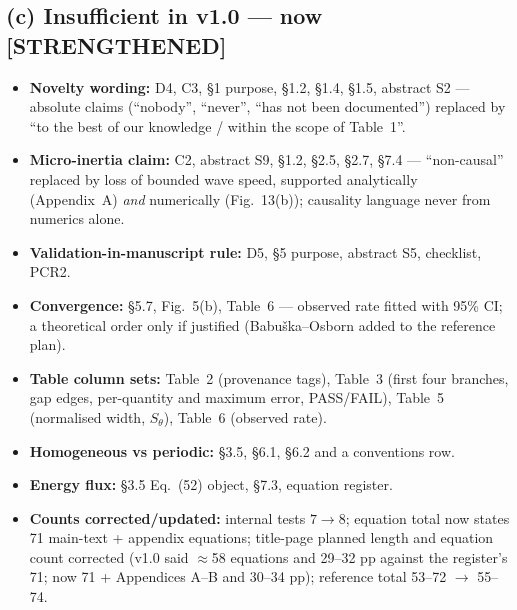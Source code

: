 \documentclass[11pt,a4paper]{article}
\newcommand{\STR}{{\color{strcol}\textbf{[STRENGTHENED]}}}
\begin{document}
\subsection*{(c) Insufficient in v1.0 --- now \STR}
\begin{itemize}
\item \textbf{Novelty wording:} D4, C3, \S1 purpose, \S1.2, \S1.4, \S1.5, abstract S2 ---
absolute claims (``nobody'', ``never'', ``has not been documented'') replaced by ``to the
best of our knowledge / within the scope of Table~1''.
\item \textbf{Micro-inertia claim:} C2, abstract S9, \S1.2, \S2.5, \S2.7, \S7.4 ---
``non-causal'' replaced by loss of bounded wave speed, supported analytically (Appendix~A)
\emph{and} numerically (Fig.~13(b)); causality language never from numerics alone.
\item \textbf{Validation-in-manuscript rule:} D5, \S5 purpose, abstract S5, checklist, PCR2.
\item \textbf{Convergence:} \S5.7, Fig.~5(b), Table~6 --- observed rate fitted with 95\% CI;
a theoretical order only if justified (Babu\v{s}ka--Osborn added to the reference plan).
\item \textbf{Table column sets:} Table~2 (provenance tags), Table~3 (first four branches,
gap edges, per-quantity and maximum error, PASS/FAIL), Table~5 (normalised width, $S_\theta$),
Table~6 (observed rate).
\item \textbf{Homogeneous vs periodic:} \S3.5, \S6.1, \S6.2 and a conventions row.
\item \textbf{Energy flux:} \S3.5 Eq.~(52) object, \S7.3, equation register.
\item \textbf{Counts corrected/updated:} internal tests $7\to8$; equation total now states
71 main-text + appendix equations; title-page planned length and equation count corrected
(v1.0 said $\approx$58 equations and 29--32 pp against the register's 71; now 71 + Appendices
A--B and 30--34 pp); reference total 53--72 $\to$ 55--74.
\end{itemize}
\end{document}
